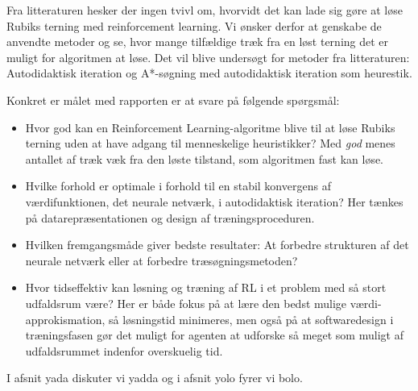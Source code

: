 \documentclass[../main.tex]{subfiles}
\begin{document}
Fra litteraturen hesker der ingen tvivl om, hvorvidt det kan lade sig gøre at løse Rubiks terning med reinforcement learning.
Vi ønsker derfor at genskabe de anvendte metoder og se, hvor mange tilfældige træk fra en løst terning det er muligt for algoritmen at løse.
Det vil blive undersøgt for metoder fra litteraturen: Autodidaktisk iteration \cite{HumansBeGone} og A*-søgning med autodidaktisk iteration som heurestik.

Konkret er målet med rapporten er at svare på følgende spørgsmål:
\begin{itemize}
	\item Hvor god kan en Reinforcement Learning-algoritme blive til at løse Rubiks terning uden at have adgang til menneskelige heuristikker? Med \textit{god} menes antallet af træk væk fra den løste tilstand, som algoritmen fast kan løse.
	\item Hvilke forhold er optimale i forhold til en stabil konvergens af værdifunktionen, det neurale netværk, i autodidaktisk iteration? Her tænkes på datarepræsentationen og design af træningsproceduren.
	\item Hvilken fremgangsmåde giver bedste resultater: At forbedre strukturen af det neurale netværk eller at forbedre træsøgningsmetoden?
	\item Hvor tidseffektiv kan løsning og træning af RL i et problem med så stort udfaldsrum være? Her er både fokus på  at lære den bedst mulige værdi-approkismation, så løsningstid minimeres, men også på at softwaredesign i træningsfasen gør det muligt for agenten at udforske så meget som muligt af udfaldsrummet indenfor overskuelig tid.
\end{itemize}
I afsnit yada diskuter vi yadda og i afsnit yolo fyrer vi bolo.


 
\end{document}
